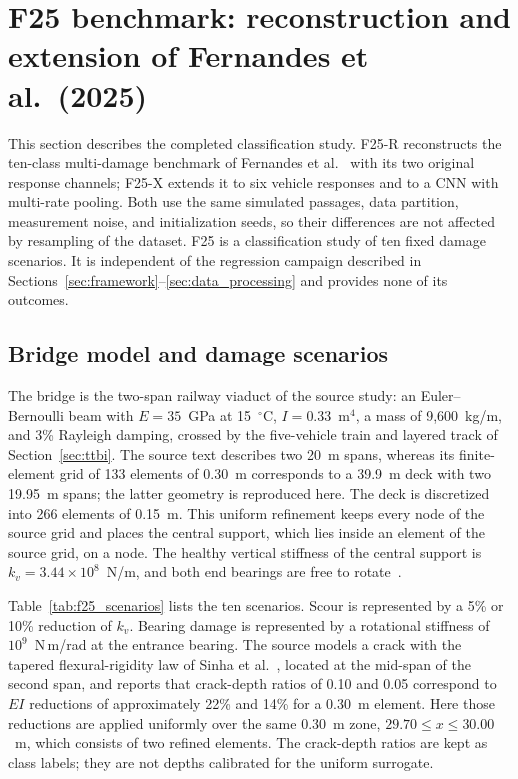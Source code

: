 \section{F25 benchmark: reconstruction and extension of Fernandes et al.\ (2025)}
\label{sec:f25_methods}

This section describes the completed classification study. F25-R reconstructs
the ten-class multi-damage benchmark of Fernandes et
al.~\cite{fernandes2025early} with its two original response channels; F25-X
extends it to six vehicle responses and to a CNN with multi-rate pooling. Both
use the same simulated passages, data partition, measurement noise, and
initialization seeds, so their differences are not affected by resampling of
the dataset. F25 is a classification study of ten fixed damage scenarios. It is
independent of the regression campaign described in
Sections~\ref{sec:framework}--\ref{sec:data_processing} and provides none of
its outcomes.

\subsection{Bridge model and damage scenarios}

The bridge is the two-span railway viaduct of the source study: an
Euler--Bernoulli beam with $E=35$~GPa at 15~$^{\circ}$C, $I=0.33$~m$^4$, a mass
of 9,600~kg/m, and 3\% Rayleigh damping, crossed by the five-vehicle train and
layered track of Section~\ref{sec:ttbi}. The source text describes two 20~m
spans, whereas its finite-element grid of 133 elements of 0.30~m corresponds to
a 39.9~m deck with two 19.95~m spans; the latter geometry is reproduced here.
The deck is discretized into 266 elements of 0.15~m. This uniform refinement
keeps every node of the source grid and places the central support, which lies
inside an element of the source grid, on a node. The healthy vertical stiffness
of the central support is $k_v=3.44\times10^{8}$~N/m, and both end bearings are
free to rotate~\cite{fernandes2025early}.

Table~\ref{tab:f25_scenarios} lists the ten scenarios. Scour is represented by a
5\% or 10\% reduction of $k_v$. Bearing damage is represented by a rotational
stiffness of $10^{9}$~N\,m/rad at the entrance bearing. The source models a
crack with the tapered flexural-rigidity law of Sinha et
al.~\cite{sinha2002simplified}, located at the mid-span of the second span, and
reports that crack-depth ratios of 0.10 and 0.05 correspond to $EI$ reductions
of approximately 22\% and 14\% for a 0.30~m element. Here those reductions are
applied uniformly over the same 0.30~m zone, $29.70\le x\le30.00$~m, which
consists of two refined elements. The crack-depth ratios are kept as class
labels; they are not depths calibrated for the uniform surrogate.

